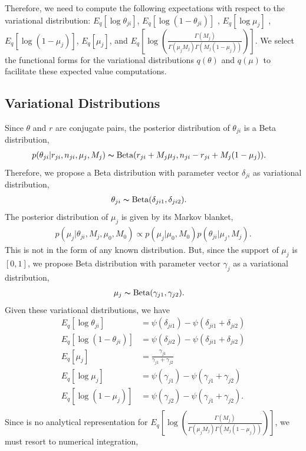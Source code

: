 \documentclass[11pt,reqno]{amsart}
\begin{document}
Therefore, we need to compute the following expectations with respect to the variational distribution:
%
$ E_q \left[ \log \theta_{ji} \right] $, $ E_q\left[ \log \left( 1 - \theta_{ji}\right) \right] $ , $ E_q  \left[ \log \mu_j \right] $ , $ E_q  \left[ \log (1 - \mu_j)\right] $, $ E_q \left[ \mu_j \right] $, and $ E_q\left[ \log \left( \frac{ \Gamma(M_j) } { \Gamma(\mu_j M_j) \Gamma(M_j (1-\mu_j)) }\right)\right] $.
We select the functional forms for the variational distributions $q(\theta)$ and $q(\mu)$ to facilitate these expected value computations.

\subsection{Variational Distributions}
Since $\theta$ and $r$ are conjugate pairs, the posterior distribution of $\theta_{ji}$ is a Beta distribution,
\begin{align}
&p(\theta_{ji}|r_{ji},n_{ji},\mu_j,M_j)
\thicksim \text{Beta}(r_{ji}+M_j \mu_j, n_{ji}-r_{ji}+M_j(1-\mu_j)).
\end{align}
Therefore, we propose a Beta distribution with parameter vector $\delta_{ji}$ as variational distribution,
\begin{align}
\theta_{ji} &\thicksim \text{Beta}(\delta_{ji1}, \delta_{ji2}) \nonumber.
\end{align}
%
The posterior distribution of $\mu_j$ is given by its Markov blanket,
\begin{align}
p(\mu_j|\theta_{ji},M_j,\mu_0,M_0)\propto p(\mu_j|\mu_0,M_0)p(\theta_{ji}|\mu_j,M_j).
\end{align}
This is not in the form of any known distribution.
But, since the support of $\mu_j$ is $[0,1]$, we propose Beta distribution with parameter vector $\gamma_{j}$ as a variational distribution,
\begin{align}
\mu_j &\thicksim \text{Beta}(\gamma_{j1}, \gamma_{j2}) \nonumber.
\end{align}
Given these variational distributions, we have
\begin{align}
E_q \left[ \log \theta_{ji} \right] &= \psi(\delta_{ji1}) - \psi(\delta_{ji1}+\delta_{ji2}) \nonumber \\
E_q \left[ \log \left( 1 - \theta_{ji}\right) \right]&= \psi(\delta_{ji2}) - \psi(\delta_{ji1}+\delta_{ji2}) \nonumber \\
E_q \left[ \mu_j \right] &= \frac{\gamma_{j1}}{\gamma_{j1} + \gamma_{j2}} \nonumber \\
E_q  \left[ \log \mu_j \right] &= \psi(\gamma_{j1}) - \psi(\gamma_{j1}+\gamma_{j2}) \nonumber \\
E_q  \left[ \log (1 - \mu_j)\right] &= \psi(\gamma_{j2}) - \psi(\gamma_{j1}+\gamma_{j2})\nonumber. \\
\end{align}
%
Since is no analytical representation for $ E_q\left[ \log \left( \frac{ \Gamma(M_j) } { \Gamma(\mu_j M_j) \Gamma(M_j (1-\mu_j)) }\right)\right] $, we must resort to numerical integration,
\end{document}
